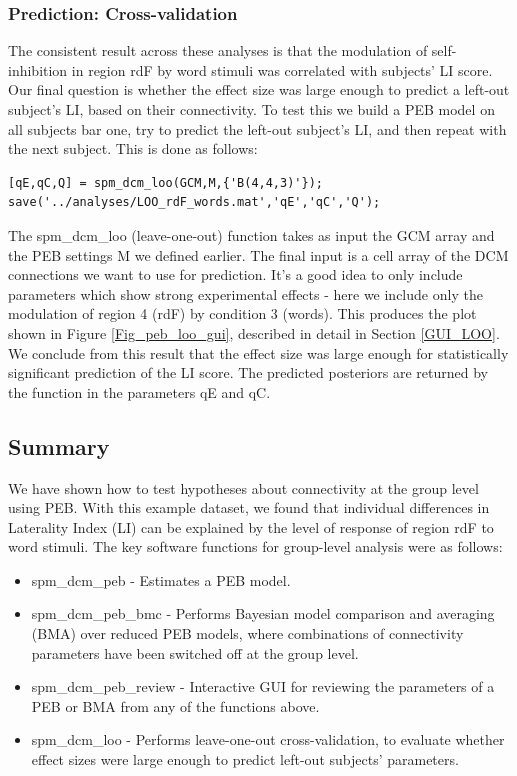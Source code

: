 \documentclass{article}
\begin{document}
\subsubsection{Prediction: Cross-validation}
The consistent result across these analyses is that the modulation of self-inhibition in region rdF by word stimuli was correlated with subjects' LI score. Our final question is whether the effect size was large enough to predict a left-out subject's LI, based on their connectivity. To test this we build a PEB model on all subjects bar one, try to predict the left-out subject's LI, and then repeat with the next subject. This is done as follows:

\begin{lstlisting}[style=Matlab-editor,caption=Cross-validation]
[qE,qC,Q] = spm_dcm_loo(GCM,M,{'B(4,4,3)'});
save('../analyses/LOO_rdF_words.mat','qE','qC','Q');
\end{lstlisting}

The spm\_dcm\_loo (leave-one-out) function takes as input the GCM array and the PEB settings M we defined earlier. The final input is a cell array of the DCM connections we want to use for prediction. It's a good idea to only include parameters which show strong experimental effects - here we include only the modulation of region 4 (rdF) by condition 3 (words). This produces the plot shown in Figure \ref{Fig_peb_loo_gui}, described in detail in Section \ref{GUI_LOO}. We conclude from this result that the effect size was large enough for statistically significant prediction of the LI score. The predicted posteriors are returned by the function in the parameters qE and qC.

\subsection{Summary}

We have shown how to test hypotheses about connectivity at the group level using PEB. With this example dataset, we found that individual differences in Laterality Index (LI) can be explained by the level of response of region rdF to word stimuli. The key software functions for group-level analysis were as follows:

\begin{itemize}
    \item spm\_dcm\_peb - Estimates a PEB model.
    \item spm\_dcm\_peb\_bmc - Performs Bayesian model comparison and averaging (BMA) over reduced PEB models, where combinations of connectivity parameters have been switched off at the group level.
    \item spm\_dcm\_peb\_review - Interactive GUI for reviewing the parameters of a PEB or BMA from any of the functions above.
    \item spm\_dcm\_loo - Performs leave-one-out cross-validation, to evaluate whether effect sizes were large enough to predict left-out subjects' parameters.
\end{itemize}
\end{document}
